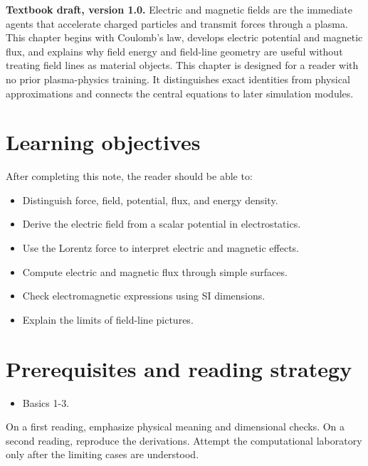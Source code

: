 \documentclass[11pt]{article}
\begin{document}

\begin{overviewbox}
\textbf{Textbook draft, version 1.0.} Electric and magnetic fields are the immediate agents that accelerate charged particles and transmit forces through a plasma. This chapter begins with Coulomb's law, develops electric potential and magnetic flux, and explains why field energy and field-line geometry are useful without treating field lines as material objects. This chapter is designed for a reader with no prior plasma-physics training. It distinguishes exact identities from physical approximations and connects the central equations to later simulation modules.
\end{overviewbox}

\ProjectTOC

\section{Learning objectives}
After completing this note, the reader should be able to:
\begin{itemize}[leftmargin=1.6em]
\item Distinguish force, field, potential, flux, and energy density.
\item Derive the electric field from a scalar potential in electrostatics.
\item Use the Lorentz force to interpret electric and magnetic effects.
\item Compute electric and magnetic flux through simple surfaces.
\item Check electromagnetic expressions using SI dimensions.
\item Explain the limits of field-line pictures.
\end{itemize}

\section{Prerequisites and reading strategy}
\begin{itemize}[leftmargin=1.6em]
\item Basics 1-3.
\end{itemize}
On a first reading, emphasize physical meaning and dimensional checks. On a second reading, reproduce the derivations. Attempt the computational laboratory only after the limiting cases are understood.
\end{document}
